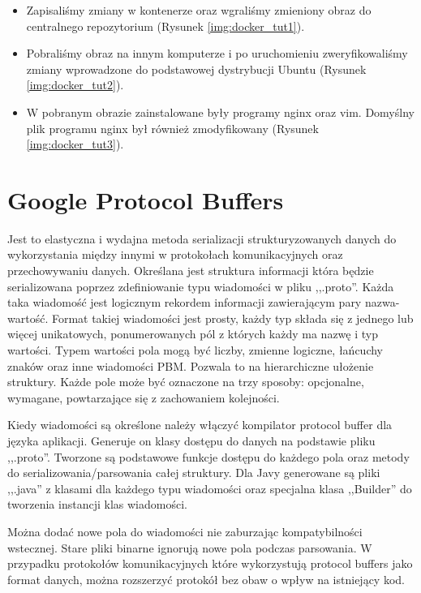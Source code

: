 \begin{itemize}
\item Zapisaliśmy zmiany w kontenerze oraz wgraliśmy zmieniony obraz do centralnego repozytorium (Rysunek \ref{img:docker_tut1}). 



\item Pobraliśmy obraz na innym komputerze i po uruchomieniu zweryfikowaliśmy zmiany wprowadzone do podstawowej dystrybucji Ubuntu (Rysunek \ref{img:docker_tut2}). 

\item W pobranym obrazie zainstalowane były programy nginx oraz vim. Domyślny plik programu nginx był również zmodyfikowany (Rysunek \ref{img:docker_tut3}).


\end{itemize}

\section[Google Protocol Buffers]{Google Protocol Buffers} \label{protobuf}

\par{Jest to elastyczna i wydajna metoda serializacji strukturyzowanych danych do wykorzystania między innymi w protokołach komunikacyjnych oraz przechowywaniu danych. Określana jest struktura informacji która będzie serializowana poprzez zdefiniowanie typu wiadomości w pliku ,,.proto''. Każda taka wiadomość jest logicznym rekordem informacji zawierającym pary nazwa-wartość. Format takiej wiadomości jest prosty, każdy typ składa się z jednego lub więcej unikatowych, ponumerowanych pól z których każdy ma nazwę i typ wartości. Typem wartości pola mogą być liczby, zmienne logiczne, łańcuchy znaków oraz inne wiadomości PBM. Pozwala to na hierarchiczne ułożenie struktury. Każde pole może być oznaczone na trzy sposoby: opcjonalne, wymagane, powtarzające się z zachowaniem kolejności.}

\par{Kiedy wiadomości są określone należy włączyć kompilator protocol buffer dla języka aplikacji. Generuje on klasy dostępu do danych na podstawie pliku ,,.proto''. Tworzone są podstawowe funkcje dostępu do każdego pola oraz metody do serializowania/parsowania całej struktury. Dla Javy generowane są pliki ,,.java'' z klasami dla każdego typu wiadomości oraz specjalna klasa ,,Builder'' do tworzenia instancji klas wiadomości.}

\par{Można dodać nowe pola do wiadomości nie zaburzając kompatybilności wstecznej. Stare pliki binarne ignorują nowe pola podczas parsowania. W przypadku protokołów komunikacyjnych które wykorzystują protocol buffers jako format danych, można rozszerzyć protokół bez obaw o wpływ na istniejący kod.}

